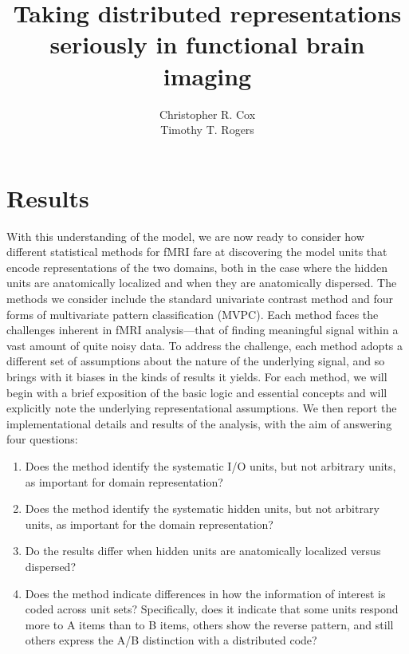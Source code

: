 \documentclass[12pt,man]{apa6}
\title{Taking distributed representations seriously in functional brain imaging}
\author{Christopher R. Cox\\Timothy T. Rogers}
\affiliation{University of Wisconsin, Madison}
\begin{document}
\maketitle







\section{Results}

With this understanding of the model, we are now ready to consider how different statistical methods for fMRI fare at discovering the model units that encode representations of the two domains, both in the case where the hidden units are anatomically localized and when they are anatomically dispersed. The methods we consider include the standard univariate contrast method and four forms of multivariate pattern classification (MVPC). Each method faces the challenges inherent in fMRI analysis---that of finding meaningful signal within a vast amount of quite noisy data. To address the challenge, each method adopts a different set of assumptions about the nature of the underlying signal, and so brings with it biases in the kinds of results it yields. For each method, we will begin with a brief exposition of the basic logic and essential concepts and will explicitly note the underlying representational assumptions. We then report the implementational details and results of the analysis, with the aim of answering four questions:

\begin{enumerate}
\item Does the method identify the systematic I/O units, but not arbitrary units, as important for domain representation?
\item Does the method identify the systematic hidden units, but not arbitrary units, as important for the domain representation?
\item Do the results differ when hidden units are anatomically localized versus dispersed?
\item Does the method indicate differences in how the information of interest is coded across unit sets? Specifically, does it indicate that some units respond more to A items than to B items, others show the reverse pattern, and still others express the A/B distinction with a distributed code? 
\end{enumerate}









%





%


\end{document}
